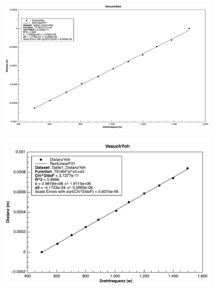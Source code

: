 \begin{figure}[H]
    \center
    \includegraphics[width=.8\textwidth]{images/w-x-alex.pdf}
    \caption{}
    \label{fig:w-x-alex}
\end{figure}

\begin{figure}[H]
    \center
    \includegraphics[width=.8\textwidth]{images/w-x-yohannes.pdf}
    \caption{}
    \label{fig:w-x-yohannes}
\end{figure}

